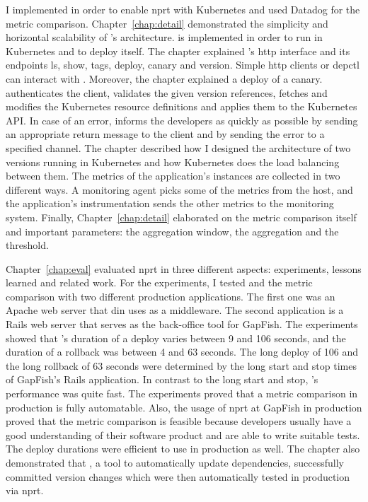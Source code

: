 I implemented \deployer{} in order to enable \gls{nprt} with Kubernetes and used Datadog for
the metric comparison. Chapter~\ref{chap:detail} demonstrated the simplicity and
horizontal scalability of \deployer{}'s architecture. \deployer{} is implemented in order to
run in Kubernetes and to deploy itself. The chapter explained \deployer{}'s \gls{http}
interface and its endpoints ls, show, tags, deploy, canary and version. Simple \gls{http}
clients or depctl can interact with \deployer{}. Moreover, the chapter explained a deploy of
a canary. \deployer{} authenticates the client, validates the given version
references, fetches and modifies the Kubernetes resource definitions and applies them to
the Kubernetes API. In case of an error, \deployer{} informs the developers as quickly as
possible by sending an appropriate return message to the client and by sending the error
to a specified channel. The chapter described how I designed the architecture of two
versions running in Kubernetes and how Kubernetes does the load balancing between
them. The metrics of the application's instances are collected in two different ways. A
monitoring agent picks some of the metrics from the host, and the application's
instrumentation sends the other metrics to the monitoring system. Finally,
Chapter~\ref{chap:detail} elaborated on the metric comparison itself and important
parameters: the aggregation window, the aggregation and the threshold.

Chapter~\ref{chap:eval} evaluated \gls{nprt} in three different aspects: experiments,
lessons learned and related work. For the experiments, I tested \deployer{} and the metric
comparison with two different production applications. The first one was an Apache web
server that \gls{din} uses as a middleware. The second application is a Rails web server
that serves as the back-office tool for GapFish. The experiments showed that \deployer{}'s
duration of a deploy varies between 9 and 106 seconds, and the duration of a rollback was between
4 and 63 seconds. The long deploy of 106 and the long rollback of 63 seconds were
determined by the long start and stop times of GapFish's Rails application. In contrast to
the long start and stop, \deployer{}'s performance was quite fast. The experiments proved that a
metric comparison in production is fully automatable. Also, the usage of \gls{nprt} at
GapFish in production proved that the metric comparison is feasible because developers
usually have a good understanding of their software product and are able to write suitable
tests. The deploy durations were efficient to use \deployer{} in production as well. The
chapter also demonstrated that \gemupdater{}, a tool to automatically update dependencies,
successfully committed version changes which were then automatically tested in production
via \gls{nprt}.

